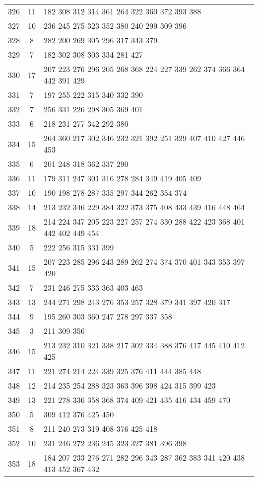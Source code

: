\documentclass{standalone}
\begin{document}
\begin{tabular}{c c l}
326 & 11 & 182 308 312 314 361 264 322 360 372 393 388 \\
327 & 10 & 236 245 275 323 352 380 240 299 309 396 \\
328 & 8 & 282 200 269 305 296 317 343 379 \\
329 & 7 & 182 302 308 303 334 281 427 \\
330 & 17 & 207 223 276 296 205 268 368 224 227 339 262 374 366 364 442 391 429 \\
331 & 7 & 197 255 222 315 340 332 390 \\
332 & 7 & 256 331 226 298 305 369 401 \\
333 & 6 & 218 231 277 342 292 380 \\
334 & 15 & 264 360 217 302 346 232 321 392 251 329 407 410 427 446 453 \\
335 & 6 & 201 248 318 362 337 290 \\
336 & 11 & 179 311 247 301 316 278 284 349 419 405 409 \\
337 & 10 & 190 198 278 287 335 297 344 262 354 374 \\
338 & 14 & 213 232 346 229 384 322 373 375 408 433 439 416 448 464 \\
339 & 18 & 214 224 347 205 223 227 257 274 330 288 422 423 368 401 442 402 449 454 \\
340 & 5 & 222 256 315 331 399 \\
341 & 15 & 207 223 285 296 243 289 262 274 374 370 401 343 353 397 420 \\
342 & 7 & 231 246 275 333 363 403 463 \\
343 & 13 & 244 271 298 243 276 353 257 328 379 341 397 420 317 \\
344 & 9 & 195 260 303 360 247 278 297 337 358 \\
345 & 3 & 211 309 356 \\
346 & 15 & 213 232 310 321 338 217 302 334 388 376 417 445 410 412 425 \\
347 & 11 & 221 274 214 224 339 325 376 411 444 385 448 \\
348 & 12 & 214 235 254 288 323 363 396 398 424 315 399 423 \\
349 & 13 & 221 278 336 358 368 374 409 421 435 416 434 459 470 \\
350 & 5 & 309 412 376 425 450 \\
351 & 8 & 211 240 273 319 408 376 425 418 \\
352 & 10 & 231 246 272 236 245 323 327 381 396 398 \\
353 & 18 & 184 207 233 276 271 282 296 343 287 362 383 341 420 438 413 452 367 432 \\

\end{tabular}
\end{document}
